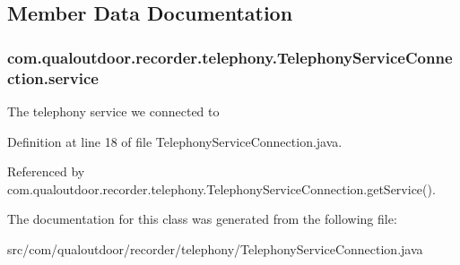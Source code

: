\subsection{Member Data Documentation}
\hypertarget{classcom_1_1qualoutdoor_1_1recorder_1_1telephony_1_1TelephonyServiceConnection_a209be452896315097a33acbe55d27519}{
\subsubsection[{service}]{ com.\-qualoutdoor.\-recorder.\-telephony.\-Telephony\-Service\-Connection.\-service\hspace{0.3cm}{\ttfamily [private]}}}\label{classcom_1_1qualoutdoor_1_1recorder_1_1telephony_1_1TelephonyServiceConnection_a209be452896315097a33acbe55d27519}
The telephony service we connected to 

Definition at line 18 of file Telephony\-Service\-Connection.\-java.



Referenced by com.\-qualoutdoor.\-recorder.\-telephony.\-Telephony\-Service\-Connection.\-get\-Service().



The documentation for this class was generated from the following file\-:\begin{DoxyCompactItemize}
\item 
src/com/qualoutdoor/recorder/telephony/Telephony\-Service\-Connection.\-java\end{DoxyCompactItemize}
